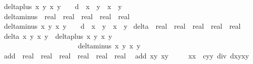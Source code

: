 \begin{isabellebody}
\ {\isachardoublequoteopen}delta{\isacharunderscore}plus\ x{}\ y{}\ x{}\ y{}\ {\isacharequal}\ {}\ {\isacharplus}\ d\ {\isacharasterisk}\ x{}\ {\isacharasterisk}\ y{}\ {\isacharasterisk}\ x{}\ {\isacharasterisk}\ y{}{\isachardoublequoteclose}\isanewline
\isanewline
{}\isamarkupfalse%
\ delta{\isacharunderscore}minus\ {\isacharcolon}{\isacharcolon}\ {\isachardoublequoteopen}real\ {\isasymRightarrow}\ real\ {\isasymRightarrow}\ real\ {\isasymRightarrow}\ real\ {\isasymRightarrow}\ real{\isachardoublequoteclose}\ \isanewline
\ {\isachardoublequoteopen}delta{\isacharunderscore}minus\ x{}\ y{}\ x{}\ y{}\ {\isacharequal}\ {}\ {\isacharminus}\ d\ {\isacharasterisk}\ x{}\ {\isacharasterisk}\ y{}\ {\isacharasterisk}\ x{}\ {\isacharasterisk}\ y{}{\isachardoublequoteclose}\isanewline
\isanewline
{}\isamarkupfalse%
\ delta\ {\isacharcolon}{\isacharcolon}\ {\isachardoublequoteopen}real\ {\isasymRightarrow}\ real\ {\isasymRightarrow}\ real\ {\isasymRightarrow}\ real\ {\isasymRightarrow}\ real{\isachardoublequoteclose}\ \isanewline
\ {\isachardoublequoteopen}delta\ x{}\ y{}\ x{}\ y{}\ {\isacharequal}\ {\isacharparenleft}delta{\isacharunderscore}plus\ x{}\ y{}\ x{}\ y{}{\isacharparenright}\ {\isacharasterisk}\ \isanewline
\ \ \ \ \ \ \ \ \ \ \ \ \ \ \ \ \ \ \ \ \ \ {\isacharparenleft}delta{\isacharunderscore}minus\ x{}\ y{}\ x{}\ y{}{\isacharparenright}{\isachardoublequoteclose}\isanewline
\isanewline
{}\isamarkupfalse%
\ add\ {\isacharcolon}{\isacharcolon}\ {\isachardoublequoteopen}real\ {\isasymtimes}\ real\ {\isasymRightarrow}\ real\ {\isasymtimes}\ real\ {\isasymRightarrow}\ real\ {\isasymtimes}\ real{\isachardoublequoteclose}\ \isanewline
\ {\isachardoublequoteopen}add\ {\isacharparenleft}x{}{\isacharcomma}y{}{\isacharparenright}\ {\isacharparenleft}x{}{\isacharcomma}y{}{\isacharparenright}\ {\isacharequal}\isanewline
\ \ \ \ {\isacharparenleft}{\isacharparenleft}x{}{\isacharasterisk}x{}\ {\isacharminus}\ c{\isacharasterisk}y{}{\isacharasterisk}y{}{\isacharparenright}\ div\ {\isacharparenleft}{}{\isacharminus}d{\isacharasterisk}x{}{\isacharasterisk}y{}{\isacharasterisk}x{}{\isacharasterisk}y{}{\isacharparenright}{\isacharcomma}\ \isanewline

\end{isabellebody}
